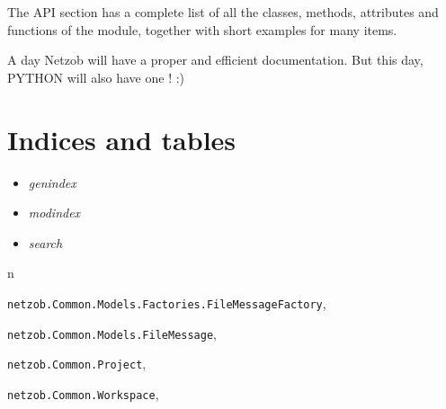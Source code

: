 \documentclass[letterpaper,10pt,english]{sphinxmanual}
\begin{document}
The API section has a complete list of all the classes, methods,
attributes and functions of the  module, together with short
examples for many items.

A day Netzob will have a proper and efficient documentation. But this day, PYTHON will also have one ! :)


\chapter{Indices and tables}
\label{index:indices-and-tables}\begin{itemize}
\item {} 
\emph{genindex}

\item {} 
\emph{modindex}

\item {} 
\emph{search}

\end{itemize}


\renewcommand{\indexname}{Python Module Index}
\begin{theindex}
\def\bigletter#1{{\Large\sffamily#1}\nopagebreak\vspace{1mm}}
\bigletter{n}
\item {\texttt{netzob.Common.Models.Factories.FileMessageFactory}}, \pageref{import/index:module-netzob.Common.Models.Factories.FileMessageFactory}
\item {\texttt{netzob.Common.Models.FileMessage}}, \pageref{import/index:module-netzob.Common.Models.FileMessage}
\item {\texttt{netzob.Common.Project}}, \pageref{API/index:module-netzob.Common.Project}
\item {\texttt{netzob.Common.Workspace}}, \pageref{API/index:module-netzob.Common.Workspace}
\end{theindex}

\renewcommand{\indexname}{Index}
\printindex
\end{document}
